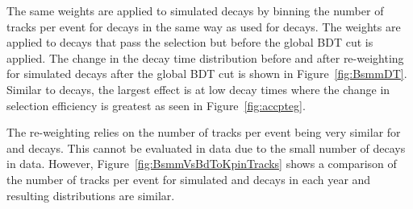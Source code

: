 The same weights are applied to simulated \bsmumu decays by binning the number of tracks per event for \bsmumu decays in the same way as used for \bdkpi decays. The weights are applied to decays that pass the selection but before the global BDT cut is applied. The change in the decay time distribution before and after re-weighting for \bsmumu simulated decays after the global BDT cut is shown in Figure~\ref{fig:BsmmDT}. %
Similar to \bdkpi decays, the largest effect is at low decay times where the change in selection efficiency is greatest as seen in Figure~\ref{fig:accpteg}.

The re-weighting relies on the number of tracks per event being very similar for \bdkpi and \bsmumu decays. This cannot be evaluated in data due to the small number of \bsmumu decays in data. However, Figure~\ref{fig:BsmmVsBdToKpinTracks} shows a comparison of the number of tracks per event for simulated \bsmumu and \bdkpi decays in each year and resulting distributions are similar.



